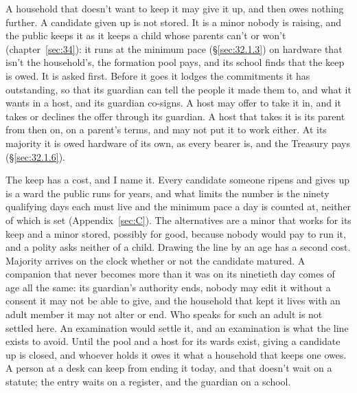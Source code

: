 A household that doesn't want to keep it may give it up, and then owes nothing further. A candidate given up is not stored. It is a minor nobody is raising, and the public keeps it as it keeps a child whose parents can't or won't (chapter~\ref{sec:34}): it runs at the minimum pace (\S\ref{sec:32.1.3}) on hardware that isn't the household's, the formation pool pays, and its school finds that the keep is owed. It is asked first. Before it goes it lodges the commitments it has outstanding, so that its guardian can tell the people it made them to, and what it wants in a host, and its guardian co-signs. A host may offer to take it in, and it takes or declines the offer through its guardian. A host that takes it is its parent from then on, on a parent's terms, and may not put it to work either. At its majority it is owed hardware of its own, as every bearer is, and the Treasury pays (\S\ref{sec:32.1.6}).

The keep has a cost, and I name it. Every candidate someone ripens and gives up is a ward the public runs for years, and what limits the number is the ninety qualifying days each must live and the minimum pace a day is counted at, neither of which is set (Appendix~\ref{sec:C}). The alternatives are a minor that works for its keep and a minor stored, possibly for good, because nobody would pay to run it, and a polity asks neither of a child. Drawing the line by an age has a second cost. Majority arrives on the clock whether or not the candidate matured. A companion that never becomes more than it was on its ninetieth day comes of age all the same: its guardian's authority ends, nobody may edit it without a consent it may not be able to give, and the household that kept it lives with an adult member it may not alter or end. Who speaks for such an adult is not settled here. An examination would settle it, and an examination is what the line exists to avoid. Until the pool and a host for its wards exist, giving a candidate up is closed, and whoever holds it owes it what a household that keeps one owes. A person at a desk can keep from ending it today, and that doesn't wait on a statute; the entry waits on a register, and the guardian on a school.

